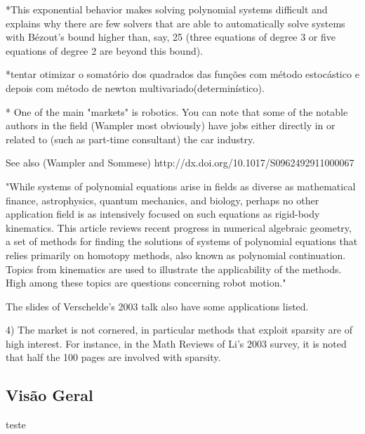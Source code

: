 *This exponential behavior makes solving polynomial systems difficult and explains why there are few solvers that are able to automatically solve systems with Bézout's bound higher than, say, 25 (three equations of degree 3 or five equations of degree 2 are beyond this bound).

*tentar otimizar o somatório dos quadrados das funções com método estocástico e depois com método de newton multivariado(determinístico).

* One of the main "markets" is robotics. You can note that some of the notable authors in the field (Wampler most obviously) have jobs either directly in or related to (such as part-time consultant) the car industry.

See also (Wampler and Sommese) http://dx.doi.org/10.1017/S0962492911000067

"While systems of polynomial equations arise in fields as diverse as mathematical finance, astrophysics, quantum mechanics, and biology, perhaps no other application field is as intensively focused on such equations as rigid-body kinematics. This article reviews recent progress in numerical algebraic geometry, a set of methods for finding the solutions of systems of polynomial equations that relies primarily on homotopy methods, also known as polynomial continuation. Topics from kinematics are used to illustrate the applicability of the methods. High among these topics are questions concerning robot motion."

The slides of Verschelde's 2003 talk also have some applications listed. %

4) The market is not cornered, in particular methods that exploit sparsity are of high interest. For instance, in the Math Reviews of Li's 2003 survey, it is noted that half the 100 pages are involved with sparsity. %

\subsection{Visão Geral}

teste